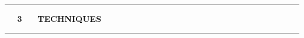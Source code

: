 \documentclass[11pt, compress, t, notes = noshow, xcolor = table, 
aspectratio = 1610]{beamer}
\newcommand{\highlight}[1]{\textcolor{highlightcol}{\textbf{#1}}}
\begin{document}

\LARGE
\begin{frame}{\phantom{foo}}
\normalsize
\vspace{-0.5cm}
\noindent \textcolor{gray!90}{\rule{\textwidth}{1pt}}
\smallskip

\Huge
\hspace{0pt}
\vfill
\textbf{\highlight{~~ 3 ~~ TECHNIQUES}}
\vfill
\hspace{0pt}

\noindent \textcolor{gray!90}{\rule{\textwidth}{1pt}}

\end{frame}

\end{document}
